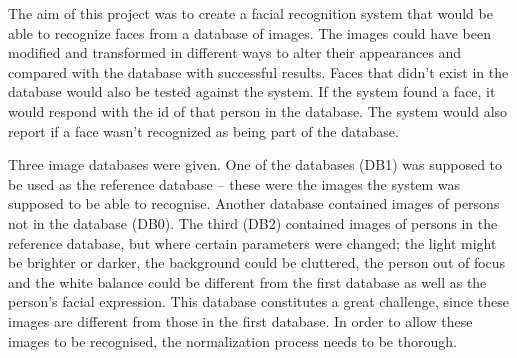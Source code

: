 The aim of this project was to create a facial recognition system that would be able to recognize faces from a database of images. The images could have been modified and transformed in different ways to alter their appearances and compared with the database with successful results. Faces that didn’t exist in the database would also be tested against the system. If the system found a face, it would respond with the id of that person in the database. The system would also report if a face wasn’t recognized as being part of the database. 

Three image databases were given. One of the databases (DB1) was supposed to be used as the reference database – these were the images the system was supposed to be able to recognise. Another database contained images of persons not in the database (DB0). The third (DB2) contained images of persons in the reference database, but where certain parameters were changed; the light might be brighter or darker, the background could be cluttered, the person out of focus and the white balance could be different from the first database as well as the person’s facial expression. This database constitutes a great challenge, since these images are different from those in the first database. In order to allow these images to be recognised, the normalization process needs to be thorough.	